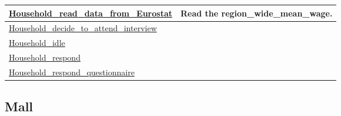 \documentclass[a4paper,11pt]{article}
\begin{document}
\begin{longtable}[H!]{ll}
\midrule
\parbox{5cm}{\url{Household_read_data_from_Eurostat}}  & \parbox{10cm}{Read the region\_wide\_mean\_wage.} \\
\midrule
\parbox{5cm}{\url{Household_decide_to_attend_interview}}  & \parbox{10cm}{} \\
\midrule
\parbox{5cm}{\url{Household_idle}}  & \parbox{10cm}{} \\
\midrule
\parbox{5cm}{\url{Household_respond}}  & \parbox{10cm}{} \\
\midrule
\parbox{5cm}{\url{Household_respond_questionnaire}}  & \parbox{10cm}{} \\
\end{longtable}

\subsection{Mall}
\end{document}

